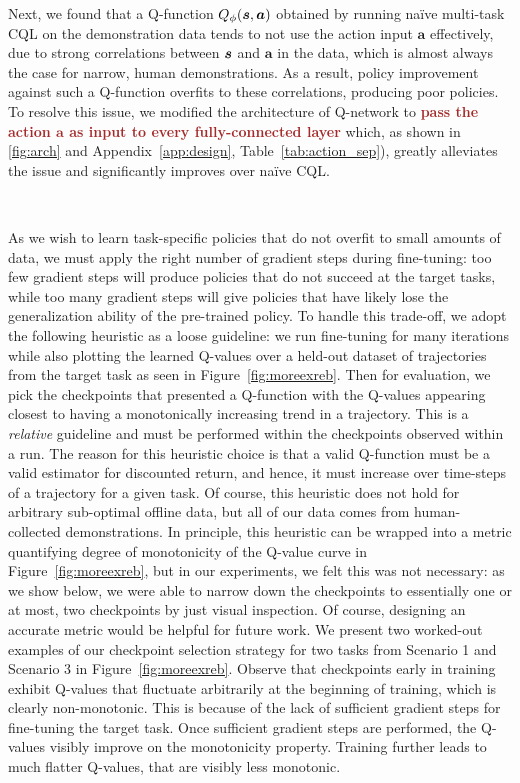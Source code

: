 Next, we found that a Q-function $Q_\phi(\boldsymbol{s}, \boldsymbol{a})$ obtained by running na\"ive multi-task CQL on the demonstration data tends to not use the action input $\mathbf{a}$ effectively, due to strong correlations between $\boldsymbol{s}$ and $\mathbf{a}$ in the data, which is almost always the case for narrow, human demonstrations. As a result, policy improvement against such a Q-function overfits to these correlations, producing poor policies. To resolve this issue, we modified the architecture of Q-network to \textcolor{brown}{\textbf{pass the action \textbf{\textit{$\mathbf{a}$}} as input to every fully-connected layer}} which, as shown in \autoref{fig:arch} and {Appendix~\ref{app:design}}, {Table~\ref{tab:action_sep}}), greatly alleviates the issue {and significantly improves over na\"ive CQL}. 

~



As we wish to learn task-specific policies that do not overfit to small amounts of data, we must apply the right number of gradient steps during fine-tuning: too few gradient steps will produce policies that do not succeed at the target tasks, while too many gradient steps will give policies that have likely lose the generalization ability of the pre-trained policy. {To handle this trade-off, we adopt the following heuristic as a loose guideline:} we run fine-tuning for many iterations while also plotting the learned Q-values over a held-out dataset of trajectories from the target task as seen in Figure~\ref{fig:moreexreb}. Then for evaluation, we pick the checkpoints that presented a Q-function with the Q-values appearing closest to having a monotonically increasing trend in a trajectory. This is a \emph{relative} guideline and must be performed within the checkpoints observed within a run. The reason for this heuristic choice is that a valid Q-function must be a valid estimator for discounted return, and hence, it must increase over time-steps of a trajectory for a given task.  Of course, this heuristic does not hold for arbitrary sub-optimal offline data, but all of our data comes from human-collected demonstrations. In principle, this heuristic can be wrapped into a metric quantifying degree of monotonicity of the Q-value curve in Figure~\ref{fig:moreexreb}, but in our experiments, we felt this was not necessary: as we show below, we were able to narrow down the checkpoints to essentially one or at most, two checkpoints by just visual inspection. Of course, designing an accurate metric would be helpful for future work. We present two worked-out examples of our checkpoint selection strategy for two tasks from Scenario 1 and Scenario 3 in Figure~\ref{fig:moreexreb}. Observe that checkpoints early in training exhibit Q-values that fluctuate arbitrarily at the beginning of training, which is clearly non-monotonic. This is because of the lack of sufficient gradient steps for fine-tuning the target task. Once sufficient gradient steps are performed, the Q-values visibly improve on the monotonicity property. Training further leads to much flatter Q-values, that are visibly less monotonic. 


